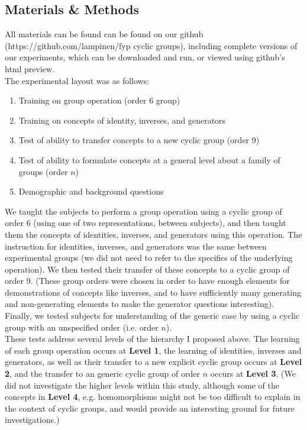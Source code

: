 \documentclass[11pt]{article}
\begin{document}
\subsection{Materials \& Methods} 
All materials can be found can be found on our github (https://github.com/lampinen/fyp cyclic groups), including complete versions of our experiments, which can be downloaded and run, or viewed using github's html preview. \\[11pt]
The experimental layout was as follows:
\begin{enumerate}
\item Training on group operation (order 6 group)
\item Training on concepts of identity, inverses, and generators
\item Test of ability to transfer concepts to a new cyclic group (order 9)
\item Test of ability to formulate concepts at a general level about a family of groups (order $n$)
\item Demographic and background questions
\end{enumerate}
We taught the subjects to perform a group operation using a cyclic group of order 6 (using one of two representations, between subjects), and then taught them the concepts of identities, inverses, and generators using this operation. The instruction for identities, inverses, and generators was the same between experimental groups (we did not need to refer to the specifics of the underlying operation). We then tested their transfer of these concepts to a cyclic group of order 9. (These group orders were chosen in order to have enough elements for demonstrations of concepts like inverses, and to have sufficiently many generating and non-generating elements to make the generator questions interesting). Finally, we tested subjects for understanding of the generic case by using a cyclic group with an unspecified order (i.e. order $n$). \\[11pt]
These tests address several levels of the hierarchy I proposed above. The learning of each group operation occurs at \textbf{Level 1}, the learning of identities, inverses and generators, as well as their transfer to a new explicit cyclic group occurs at \textbf{Level 2}, and the transfer to an generic cyclic group of order $n$ occurs at \textbf{Level 3}. (We did not investigate the higher levels within this study, although some of the concepts in \textbf{Level 4}, e.g. homomorphisms might not be too difficult to explain in the context of cyclic groups, and would provide an interesting ground for future investigations.)  
\end{document}
